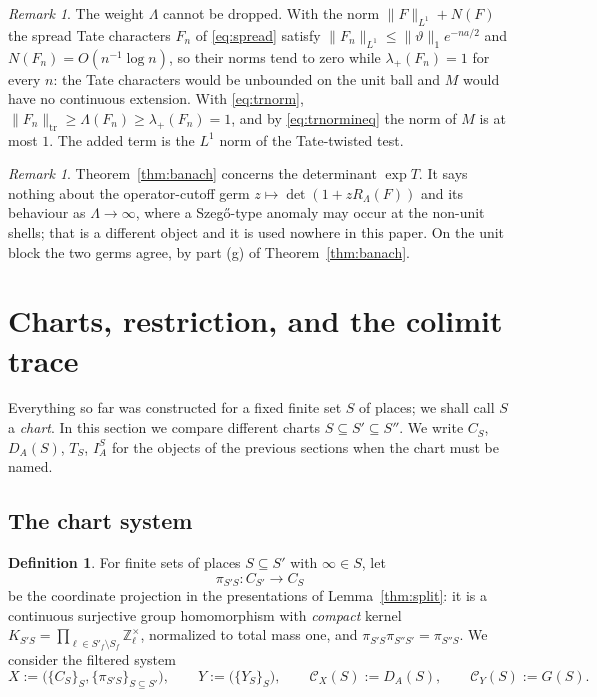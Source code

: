 \documentclass[11pt]{amsart}
\theoremstyle{definition}
\newtheorem{definition}[theorem]{Definition}
\theoremstyle{remark}
\newtheorem{remark}[theorem]{Remark}
\newcommand{\Z}{\mathbb Z}
\newcommand{\DA}{D_A}
\begin{document}
\begin{remark}\label{rem:whynorm}
The weight $\Lambda$ cannot be dropped.  With the norm
$\lVert F\rVert_{L^{1}}+N(F)$ the spread Tate characters $F_n$ of
\eqref{eq:spread} satisfy $\lVert F_n\rVert_{L^{1}}\le\lVert\vartheta\rVert_1
e^{-na/2}$ and $N(F_n)=O(n^{-1}\log n)$, so their norms tend to zero while
$\lambda_+(F_n)=1$ for every $n$: the Tate characters would be unbounded on the
unit ball and $M$ would have no continuous extension.  With \eqref{eq:trnorm},
$\lVert F_n\rVert_{\mathrm{tr}}\ge\Lambda(F_n)\ge\lambda_+(F_n)=1$, and by
\eqref{eq:trnormineq} the norm of $M$ is at most $1$.  The added term is the
$L^{1}$ norm of the Tate-twisted test.
\end{remark}

\begin{remark}\label{rem:twodets}
Theorem~\ref{thm:banach} concerns the determinant $\exp T$.  It says nothing
about the operator-cutoff germ $z\mapsto\det(1+zR_{\Lambda}(F))$ and its
behaviour as $\Lambda\to\infty$, where a Szeg\H o-type anomaly may occur at the
non-unit shells; that is a different object and it is used nowhere in this
paper.  On the unit block the two germs agree, by part (g) of
Theorem~\ref{thm:banach}.
\end{remark}

\section{Charts, restriction, and the colimit trace}\label{sec:charts}

Everything so far was constructed for a fixed finite set $S$ of places; we
shall call $S$ a \emph{chart}.  In this section we compare different charts
$S\subseteq S'\subseteq S''$.  We write $C_S$, $\DA(S)$, $T_S$, $I_A^{S}$ for
the objects of the previous sections when the chart must be named.

\subsection{The chart system}

\begin{definition}\label{def:chartsystem}
For finite sets of places $S\subseteq S'$ with $\infty\in S$, let
\begin{equation}\label{eq:piTS}
\pi_{S'S}:C_{S'}\longrightarrow C_S
\end{equation}
be the coordinate projection in the presentations of Lemma~\ref{thm:split}: it
is a continuous surjective group homomorphism with \emph{compact} kernel
$K_{S'S}=\prod_{\ell\in S'_f\setminus S_f}\Z_{\ell}^{\times}$, normalized to
total mass one, and $\pi_{S'S}\pi_{S''S'}=\pi_{S''S}$.  We consider the filtered system
\begin{equation}\label{eq:chartsystem}
X:=\bigl(\{C_S\}_S,\{\pi_{S'S}\}_{S\subseteq S'}\bigr),\qquad
Y:=\bigl(\{Y_S\}_S\bigr),\qquad
\mathcal C_X(S):=\DA(S),\qquad \mathcal C_Y(S):=G(S).
\end{equation}
\end{definition}
\end{document}
